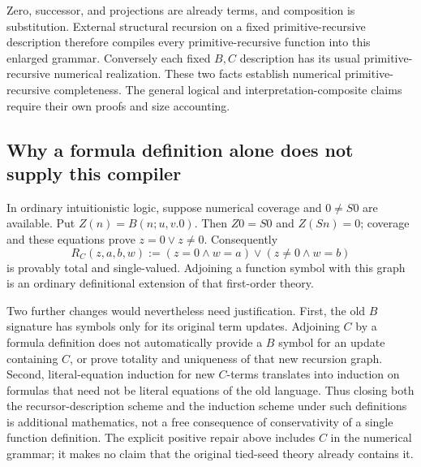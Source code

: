 Zero, successor, and projections are already terms, and composition is
substitution. External structural recursion on a fixed primitive-recursive
description therefore compiles every primitive-recursive function into this
enlarged grammar. Conversely each fixed $B,C$ description has its usual
primitive-recursive numerical realization. These two facts establish
numerical primitive-recursive completeness. The general logical and
interpretation-composite claims require their own proofs and size accounting.

\subsection{Why a formula definition alone does not supply this compiler}

In ordinary intuitionistic logic, suppose numerical coverage and $0\ne S0$
are available. Put $Z(n)=B(n;u,v.0)$. Then $Z0=S0$ and $Z(Sn)=0$;
coverage and these equations prove $z=0\vee z\ne0$. Consequently
\[
 R_C(z,a,b,w):=(z=0\wedge w=a)\vee(z\ne0\wedge w=b)
\]
is provably total and single-valued. Adjoining a function symbol with this
graph is an ordinary definitional extension of that first-order theory.

Two further changes would nevertheless need justification. First, the old
$B$ signature has symbols only for its original term updates. Adjoining
$C$ by a formula definition does not automatically provide a $B$ symbol
for an update containing $C$, or prove totality and uniqueness of that new
recursion graph. Second, literal-equation induction for new $C$-terms
translates into induction on formulas that need not be literal equations
of the old language. Thus closing both the recursor-description scheme and
the induction scheme under such definitions is additional mathematics,
not a free consequence of conservativity of a single function definition.
The explicit positive repair above includes $C$ in the numerical grammar;
it makes no claim that the original tied-seed theory already contains it.

